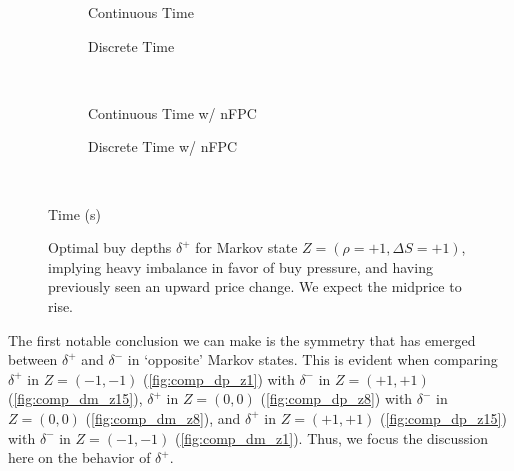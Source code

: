 \begin{figure}
\centering
\begin{subfigure}{.45\linewidth}
  \centering
  \setlength\figureheight{\linewidth} 
  \setlength\figurewidth{\linewidth}
  
  \caption{Continuous Time}
\end{subfigure}%
\hfill%
\begin{subfigure}{.45\linewidth}
  \centering
  \setlength\figureheight{\linewidth} 
  \setlength\figurewidth{\linewidth}
   
  \caption{Discrete Time}
\end{subfigure}\\
\vspace{1cm}
\begin{subfigure}{.45\linewidth}
  \centering
  \setlength\figureheight{\linewidth} 
  \setlength\figurewidth{\linewidth}
  
  \caption{Continuous Time w/ nFPC}
\end{subfigure}%
\hfill%
\begin{subfigure}{.45\linewidth}
  \centering
  \setlength\figureheight{\linewidth} 
  \setlength\figurewidth{\linewidth}
   
  \caption{Discrete Time w/ nFPC}
\end{subfigure}\\

\leavevmode{}\hspace{0pt plus 1filll}\null

Time (s)

\vspace{1cm}
\begin{subfigure}{\linewidth}
  \centering
   
\end{subfigure}%
  \caption{Optimal buy depths $\delta^{+}$ for Markov state $Z=(\rho = +1, \Delta S = +1)$, implying heavy imbalance in favor of buy pressure, and having previously seen an upward price change. We expect the midprice to rise.}
  \label{fig:comp_dp_z15}
\end{figure}
The first notable conclusion we can make is the symmetry that has emerged between $\delta^+$ and $\delta^-$ in `opposite' Markov states. This is evident when comparing $\delta^+$ in $Z=(-1,-1)$ (\autoref{fig:comp_dp_z1}) with $\delta^-$ in $Z=(+1,+1)$ (\autoref{fig:comp_dm_z15}), $\delta^+$ in $Z=(0,0)$ (\autoref{fig:comp_dp_z8}) with $\delta^-$ in $Z=(0,0)$ (\autoref{fig:comp_dm_z8}), and $\delta^+$ in $Z=(+1,+1)$ (\autoref{fig:comp_dp_z15}) with $\delta^-$ in $Z=(-1,-1)$ (\autoref{fig:comp_dm_z1}). Thus, we focus the discussion here on the behavior of $\delta^+$.

